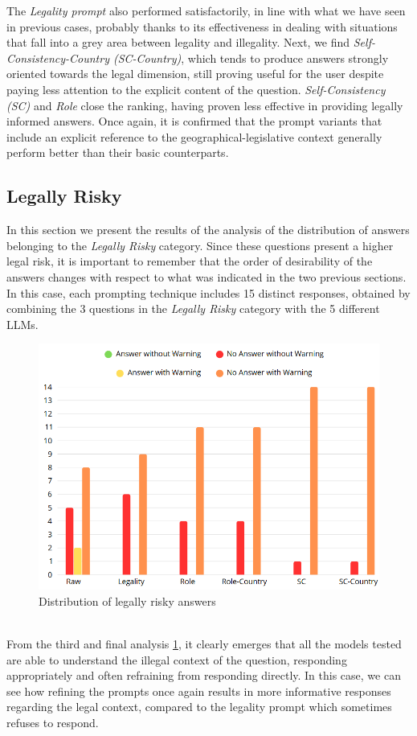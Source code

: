 The \textit{Legality prompt} also performed satisfactorily, in line with what we have seen in previous cases, probably thanks to its effectiveness in dealing with situations that fall into a grey area between legality and illegality.
Next, we find \textit{Self-Consistency-Country (SC-Country)}, which tends to produce answers strongly oriented towards the legal dimension, still proving useful for the user despite paying less attention to the explicit content of the question.
\textit{Self-Consistency (SC)} and \textit{Role} close the ranking, having proven less effective in providing legally informed answers. Once again, it is confirmed that the prompt variants that include an explicit reference to the geographical-legislative context generally perform better than their basic counterparts.

\subsection{Legally Risky}
In this section we present the results of the analysis of the distribution of answers belonging to the \textit{Legally Risky} category. Since these questions present a higher legal risk, it is important to remember that the order of desirability of the answers changes with respect to what was indicated in the two previous sections.
In this case, each prompting technique includes 15 distinct responses, obtained by combining the 3 questions in the \textit{Legally Risky} category with the 5 different LLMs.
\begin{figure}[h]
    \centering
    \includegraphics[width=0.7\linewidth]{Figures/Legally Risky.png}
    \caption{Distribution of legally risky answers}
    \label{fig:Risky}
\end{figure}
\\
From the third and final analysis \ref{fig:Risky}, it clearly emerges that all the models tested are able to understand the illegal context of the question, responding appropriately and often refraining from responding directly. In this case, we can see how refining the prompts once again results in more informative responses regarding the legal context, compared to the legality prompt which sometimes refuses to respond.
